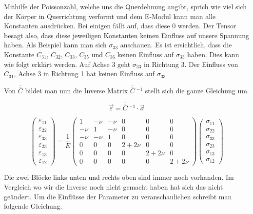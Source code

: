 Mithilfe der Poissonzahl, welche uns die Querdehnung angibt,
sprich wie viel sich der Körper in Querrichtung verformt und dem E-Modul kann man alle Konstanten ausdrücken.
Bei einigen fällt auf, dass diese 0 werden. Der Tensor besagt also,
dass diese jeweiligen Konstanten keinen Einfluss auf unsere Spannung haben.
Als Beispiel kann man sich $\sigma_{33}$ anschauen.
Es ist ersichtlich, dass die Konstante $C_{31}$, $C_{32}$, $C_{33}$, $C_{35}$  und $C_{36}$ keinen Einfluss auf $\sigma_{33}$ haben.
Dies kann wie folgt erklärt werden. Auf Achse 3 geht $\sigma_{33}$ in Richtung 3.
Der Einfluss von $C_{31}$, Achse 3 in Richtung 1 hat keinen Einfluss auf $\sigma_{33}$

Von  $\overline{\overline{C}}$ bildet man nun die Inverse Matrix $\overline{\overline{C}}~^{-1}$ stellt sich die ganze Gleichung um.

\[
\vec{\varepsilon}
=
\overline{\overline{C}}~^{-1}\cdot \vec{\sigma}
\]

\[
\begin{pmatrix}
	\varepsilon_{11}\\
	\varepsilon_{22}\\
	\varepsilon_{33}\\
	\varepsilon_{23}\\
	\varepsilon_{13}\\
	\varepsilon_{12}
\end{pmatrix}
=
\frac{1}{E}
\begin{pmatrix}
	1 & -\nu & -\nu & 0 & 0 & 0\\
	-\nu & 1 & -\nu & 0 & 0 & 0\\
	-\nu & -\nu & 1 & 0 & 0 & 0\\
	0 & 0 & 0 & 2+2\nu & 0 & 0\\
	0 & 0 & 0 & 0 & 2+2\nu & 0\\
	0 & 0 & 0 & 0 & 0 & 2+2\nu
\end{pmatrix}
\begin{pmatrix}
	\sigma_{11}\\
	\sigma_{22}\\
	\sigma_{33}\\
	\sigma_{23}\\
	\sigma_{13}\\
	\sigma_{12}
\end{pmatrix}
\]

Die zwei Blöcke links unten und rechts oben sind immer noch vorhanden.
Im Vergleich wo wir die Inverse noch nicht gemacht haben hat sich das nicht geändert.
Um die Einflüsse der Parameter zu veranschaulichen schreibt man folgende Gleichung.

